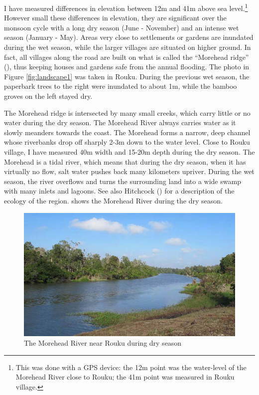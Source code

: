 I have measured differences in elevation between 12m and 41m above sea level.\footnote{This was done with a GPS device: the 12m point was the water-level of the Morehead River close to Rouku; the 41m point was measured in Rouku village.} However small these differences in elevation, they are significant over the monsoon cycle with a long dry season (June - November) and an intense wet season (January - May). Areas very close to settlements or gardens are inundated during the wet season, while the larger villages are situated on higher ground. In fact, all villages along the road are built on what is called the ``Morehead ridge'' (\citealt[15]{Paijmans:1971morehead}), thus keeping houses and gardens safe from the annual flooding. The photo in Figure \ref{fig:landscape1} was taken in Rouku. During the previous wet season, the paperbark trees to the right were inundated to about 1m, while the bamboo groves on the left stayed dry.

The Morehead ridge is intersected by many small creeks, which carry little or no water during the dry season. The Morehead River always carries water as it slowly meanders towards the coast. The Morehead forms a narrow, deep channel whose riverbanks drop off sharply 2-3m down to the water level. Close to Rouku village, I have measured 40m width and 15-20m depth during the dry season. The Morehead is a tidal river, which means that during the dry season, when it has virtually no flow, salt water pushes back many kilometers upriver. During the wet season, the river overflows and turns the surrounding land into a wide swamp with many inlets and lagoons. See also Hitchcock (\citeyear[100]{Hitchcock:2004vk}) for a description of the ecology of the region.  shows the Morehead River during the dry season.

\begin{figure}
    \includegraphics[width=.9\textwidth]{figures/landscape2.jpg}
  \caption[Morehead River]{The Morehead River near Rouku during dry season}
  \label{fig:landscape2}
\end{figure}%

